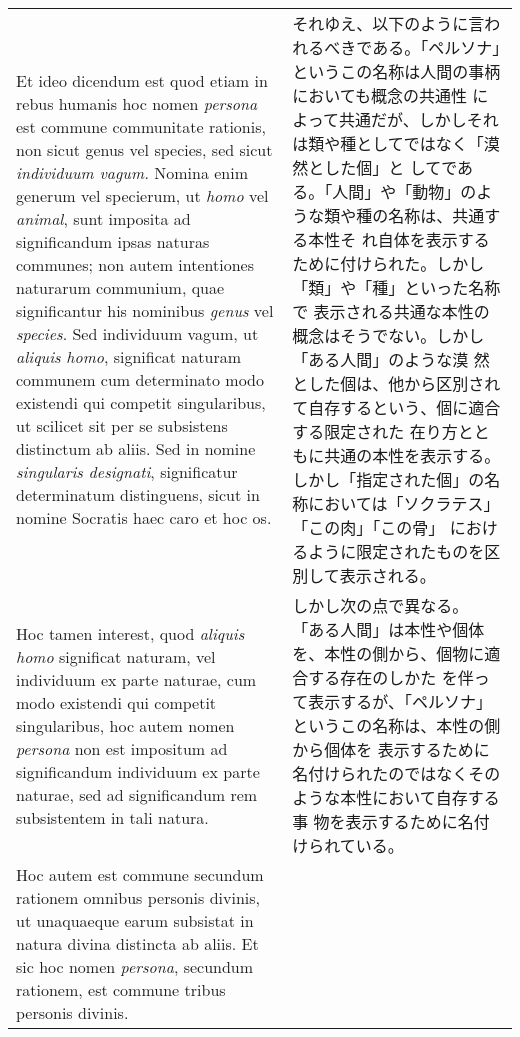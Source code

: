 \documentclass[10pt]{jsarticle} %
\begin{document}
\begin{longtable}{p{21em}p{21em}}
\\


Et ideo dicendum est quod etiam in rebus humanis hoc nomen
{\itshape persona} est commune communitate rationis, non sicut genus vel species,
sed sicut {\itshape individuum vagum.} Nomina enim generum vel specierum, ut {\itshape homo}
vel {\itshape animal}, sunt imposita ad significandum ipsas naturas communes; non
autem intentiones naturarum communium, quae significantur his
nominibus {\itshape genus} vel {\itshape species}. Sed individuum vagum, ut {\itshape aliquis homo},
significat naturam communem cum determinato modo existendi qui
competit singularibus, ut scilicet sit per se subsistens distinctum ab
aliis. 
Sed in nomine {\itshape singularis designati}, significatur determinatum
distinguens, sicut in nomine Socratis haec caro et hoc os.

&

それゆえ、以下のように言われるべきである。「ペルソナ」というこの名称は人間の事柄においても概念の共通性
 によって共通だが、しかしそれは類や種としてではなく「漠然とした個」と
 してである。「人間」や「動物」のような類や種の名称は、共通する本性そ
 れ自体を表示するために付けられた。しかし「類」や「種」といった名称で
 表示される共通な本性の概念はそうでない。しかし「ある人間」のような漠
 然とした個は、他から区別されて自存するという、個に適合する限定された
 在り方とともに共通の本性を表示する。
しかし「指定された個」の名称においては「ソクラテス」「この肉」「この骨」
におけるように限定されたものを区別して表示される。

\\

 Hoc tamen
interest, quod {\itshape aliquis homo} significat naturam, vel individuum ex
parte naturae, cum modo existendi qui competit singularibus, hoc autem
nomen {\itshape persona} non est impositum ad significandum individuum ex parte
naturae, sed ad significandum rem subsistentem in tali natura. 

&

しかし次の点で異なる。
 「ある人間」は本性や個体を、本性の側から、個物に適合する存在のしかた
 を伴って表示するが、「ペルソナ」というこの名称は、本性の側から個体を
 表示するために名付けられたのではなくそのような本性において自存する事
 物を表示するために名付けられている。


\\


Hoc
autem est commune secundum rationem omnibus personis divinis, ut
unaquaeque earum subsistat in natura divina distincta ab aliis. Et sic
hoc nomen {\itshape persona}, secundum rationem, est commune tribus personis
divinis.


\end{longtable}
\end{document}
